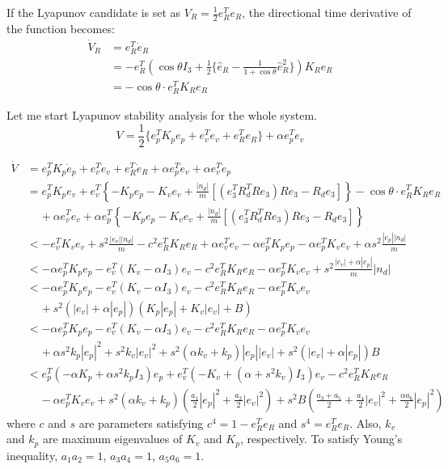 \documentclass{article}
\begin{document}
If the Lyapunov candidate is set as $V_R = \frac{1}{2}e_R^Te_R$, the directional time derivative of the function becomes:
\begin{align}
    \dot{V}_R &= e_R^T\dot{e}_R \nonumber \\
    &= -e_R^T(\cos\theta I_3 + \frac{1}{2}\{\hat{e}_R - \frac{1}{1+\cos\theta}\hat{e}_R^2\})K_Re_R \nonumber \\
    &= -\cos\theta \cdot e_R^T K_Re_R \nonumber
\end{align}

Let me start Lyapunov stability analysis for the whole system.
\begin{equation}
    V = \frac{1}{2}\{e_p^TK_pe_p + e_v^Te_v + e_R^Te_R\}+ \alpha e_p^T e_v\nonumber
\end{equation}

\begin{align}
    \dot{V} &= e_p^T K_p\dot{e}_p + e_v^T \dot{e}_v + e_R^T \dot{e}_R + \alpha e_p^T \dot{e}_v + \alpha e_v^T \dot{e}_p \nonumber \\
    &= e_p^T K_pe_v + e_v^T \left\{ -K_pe_p -K_ve_v + \frac{|n_d|}{m}\left[ (e_3^TR_d^TRe_3)Re_3-R_de_3 \right] \right\} -\cos\theta\cdot e_R^T K_R e_R  \nonumber \\
    &\;\;\;\;+\alpha e_v^T e_v + \alpha e_p^T \left\{ -K_pe_p -K_ve_v + \frac{|n_d|}{m} \left[ (e_3^TR_d^TRe_3)Re_3-R_de_3 \right] \right\}\nonumber \\
    &< -e_v^T K_v e_v + s^2 \frac{|e_v||n_d|}{m} - c^2 e_R^TK_Re_R + \alpha e_v^T e_v -\alpha e_p^TK_p e_p -\alpha e_p^TK_ve_v +\alpha s^2\frac{|e_p||n_d|}{m} \nonumber \\
    &< -\alpha e_p^TK_pe_p -e_v^T(K_v-\alpha I_3)e_v - c^2 e_R^T K_R e_R - \alpha e_p^T K_v e_v + s^2\frac{|e_v| + \alpha|e_p|}{m}|n_d| \nonumber \nonumber \\
    &< -\alpha e_p^TK_pe_p -e_v^T(K_v-\alpha I_3)e_v - c^2 e_R^T K_R e_R - \alpha e_p^T K_v e_v \nonumber \\
    &\;\;\;\;+ s^2(|e_v| + \alpha|e_p|)(K_p|e_p| + K_v |e_v| + B) \nonumber \\ 
    &< -\alpha e_p^TK_pe_p -e_v^T(K_v-\alpha I_3)e_v - c^2 e_R^T K_R e_R - \alpha e_p^T K_v e_v \nonumber \\
    &\;\;\;\;+ \alpha s^2 k_p|e_p|^2 + s^2k_v|e_v|^2 + s^2(\alpha k_v + k_p)|e_p||e_v| + s^2(|e_v| + \alpha|e_p|)B \nonumber \\ 
    &< e_p^T(-\alpha K_p + \alpha s^2 k_p I_3)e_p + e_v^T(-K_v+(\alpha + s^2 k_v) I_3)e_v - c^2 e_R^T K_R e_R \nonumber \\
    &\;\;\;\;- \alpha e_p^T K_v e_v + s^2(\alpha k_v + k_p)(\frac{a_1}{2}|e_p|^2 + \frac{a_2}{2}|e_v|^2) + s^2B(\frac{a_3+a_5}{2} + \frac{a_4}{2}|e_v|^2 +\frac{\alpha a_6}{2}|e_p|^2) \nonumber 
\end{align}
where $c$ and $s$ are parameters satisfying $c^4 = 1 - e_R^T e_R$ and $s^4 = e_R^Te_R$. Also, $k_v$ and $k_p$ are maximum eigenvalues of $K_v$ and $K_p$, respectively. 
To satisfy Young's inequality, $a_1a_2 = 1$, $a_3a_4 = 1$, $a_5a_6 = 1$.
\end{document}
